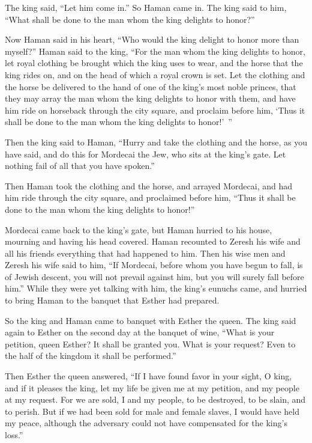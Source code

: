 The king said, “Let him come in.”
\myverse{}So Haman came in. The king said to him, “What shall be done to the man whom
the king delights to honor?”

Now Haman said in his heart, “Who would the king delight to honor more than myself?”
\myverse{}Haman said to the king, “For the man whom the king delights to honor,
\myverse{}let royal clothing be brought which the king uses to wear, and the horse that
the king rides on, and on the head of which a royal crown is set.
\myverse{}Let the clothing and the horse be delivered to the hand of one of the king’s
most noble princes, that they may array the man whom the king delights to honor with them, and have him
ride on horseback through the city square, and proclaim before him, ‘Thus it shall be done to the man
whom the king delights to honor!’ ”

\myverse{}Then the king said to Haman, “Hurry and take the clothing and
the horse, as you have said, and do this for Mordecai the Jew, who sits at the king’s gate. Let nothing
fail of all that you have spoken.”

\myverse{}Then Haman took the clothing and the horse, and arrayed Mordecai,
and had him ride through the city square, and proclaimed before him, “Thus it shall be done to the man
whom the king delights to honor!”

\myverse{}Mordecai came back to the king’s gate, but Haman hurried to his
house, mourning and having his head covered.
\myverse{}Haman recounted to Zeresh his wife and all his friends everything that had
happened to him. Then his wise men and Zeresh his wife said to him, “If Mordecai, before whom you have
begun to fall, is of Jewish descent, you will not prevail against him, but you will surely fall before
him.”
\myverse{}While they were yet talking with him, the king’s eunuchs came, and hurried
to bring Haman to the banquet that Esther had prepared.



\mychapter{}\myverse*{}So the king and Haman came to banquet with Esther the queen.
\myverse{}The king said again to Esther on the second day at the banquet of wine, “What
is your petition, queen Esther? It shall be granted you. What is your request? Even to the half of the
kingdom it shall be performed.”

\myverse{}Then Esther the queen answered, “If I have found favor in your
sight, O king, and if it pleases the king, let my life be given me at my petition, and my people at my
request.
\myverse{}For we are sold, I and my people, to be destroyed, to be slain, and to perish.
But if we had been sold for male and female slaves, I would have held my peace, although the adversary
could not have compensated for the king’s loss.”

